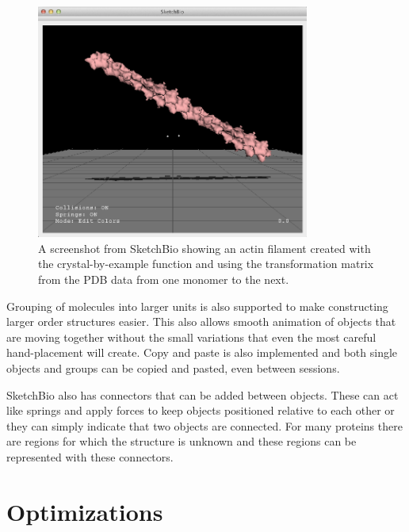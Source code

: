 \documentclass{article} %
\begin{document}
\begin{figure}[h]
\centering
\includegraphics[width=0.8\textwidth]{crystal_actin.png}
\caption{A screenshot from SketchBio showing an actin filament created with the crystal-by-example function and using the transformation matrix from the PDB data from one monomer to the next.}
\label{fig:crystal_actin}
\end{figure}

Grouping of molecules into larger units is also supported to make constructing larger order structures easier.  This also allows smooth animation of objects that are moving together without the small variations that even the most careful hand-placement will create.  Copy and paste is also implemented and both single objects and groups can be copied and pasted, even between sessions.

SketchBio also has connectors that can be added between objects.  These can act like springs and apply forces to keep objects positioned relative to each other or they can simply indicate that two objects are connected.  For many proteins there are regions for which the structure is unknown and these regions can be represented with these connectors.

\section{Optimizations}
\end{document}
